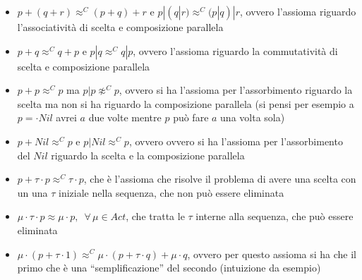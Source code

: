 \documentclass[a4paper,12pt, oneside]{book}
\begin{document}
\begin{itemize}
  \item $p+(q+r)\approx^C (p+q)+r$ e $p|(q|r)\approx^C (p|q)|r$, ovvero
  l'assioma riguardo l'associatività di scelta e composizione parallela
  \item $p+q\approx^C q+p$ e $p|q\approx^Cq|p$, ovvero
  l'assioma riguardo la commutatività di scelta e composizione parallela
  \item $p+p\approx^C p$ ma $p|p\not\approx^C p$, ovvero si ha l'assioma per
  l'assorbimento riguardo la scelta ma non si ha riguardo la composizione
  parallela (si pensi per esempio a $p=\cdot Nil$ avrei $a$ due volte mentre $p$
  può fare $a$ una volta sola)  
  \item $p+Nil\approx^C p$ e $p|Nil \approx^Cp$, ovvero ovvero si ha l'assioma
  per l'assorbimento del $Nil$ riguardo la scelta e la composizione parallela
  \item $p+\tau\cdot p\approx^C\tau\cdot p$, che è l'assioma che risolve il
  problema di avere una scelta con un una $\tau$ iniziale nella sequenza, che
  non può essere eliminata
  \item $\mu\cdot \tau\cdot p\approx \mu\cdot p,\,\,\,\forall\,\mu\in Act$, che
  tratta le $\tau$ interne alla sequenza, che può essere eliminata
  \item $\mu\cdot(p+\tau\cdot 1)\approx^C\mu\cdot(p+\tau\cdot q)+\mu\cdot q$,
  ovvero per questo assioma si ha che il primo che è una ``semplificazione''
  del secondo (intuizione da esempio)
\end{itemize}
\end{document}
